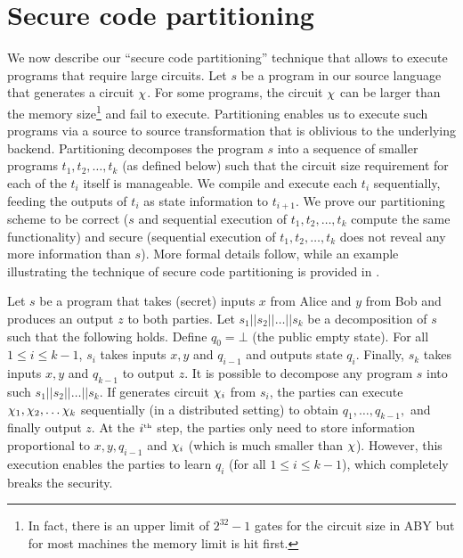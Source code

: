 \vspace{-0.1in}
\section{Secure code partitioning}
\label{sec:pipe}

\newcommand{\prog}{s}
\newcommand{\progn}{t}
\newcommand{\seq}{||}
\newcommand{\stateq}{q}

We  now describe our ``secure code partitioning'' technique that
allows \tool to execute programs that require large circuits.
Let $\prog$ be a program in our source language that
generates a circuit $\chi$. For some programs, the circuit $\chi$
can be larger than
the memory size\footnote{In fact, there is
  an upper limit of $2^{32}-1$ gates for the circuit size in ABY but
  for most machines the memory limit is hit first.} and fail to
execute. Partitioning enables us to 
execute such programs via a source to source transformation that is
oblivious to the underlying \mpc backend. Partitioning decomposes the
program $\prog$ into a sequence of smaller \tool programs
$\progn_1,\progn_2,\ldots,\progn_k$ (as defined below) such
that the circuit size
requirement for each of the $\progn_i$ itself is manageable. We compile
and execute each $\progn_i$ sequentially, feeding the outputs of
$\progn_i$ as state
information to $\progn_{i+1}$. We prove our partitioning scheme to be
correct ($\prog$ and sequential execution of $\progn_1,\progn_2,\ldots,\progn_k$ compute
the same functionality) and secure (sequential execution of
$\progn_1,\progn_2,\ldots,\progn_k$ does
not reveal any more information than $\prog$). More formal details follow, while an example illustrating the technique of secure code partitioning is provided in  . 

Let $\prog$ be a program that takes (secret) inputs $x$ from Alice and
$y$ from Bob and produces an output $z$ to both parties. Let
$\prog_1\seq\prog_2\seq\dots\seq\prog_k$ be a decomposition of $\prog$
such that the following holds. Define $\stateq_0 = \bot$ (the public empty
state). For all
$1\leq i\leq k-1$, $\prog_i$ takes inputs $x, y$ and $\stateq_{i-1}$ and
outputs state $\stateq_i$. Finally, $\prog_k$ takes inputs $x, y$ and
$\stateq_{k-1}$ to  output $z$. It is
possible to decompose any program $\prog$  into such
$\prog_1\seq\prog_2\seq\dots\seq\prog_k$. If \tool generates circuit
$\chi_i$ from
$\prog_i$, the parties can execute
$\chi_1, \chi_2, \dots \chi_k$
sequentially (in a distributed setting)  to obtain
$\stateq_1,\dots,\stateq_{k-1},$ and finally output $z$. At the
$i^{\textrm{\tiny{th}}}$ step, the parties only need to store
information proportional to $x,y,\stateq_{i-1}$ and $\chi_i$ (which is
much smaller than $\chi$). However, this execution enables the
parties to learn $\stateq_i$ (for all $1\leq i\leq k-1$), which
completely breaks the security.

